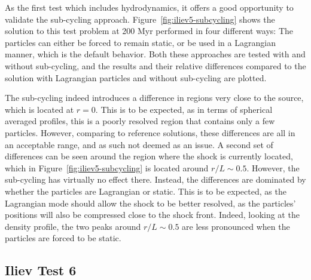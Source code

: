 As the first test which includes hydrodynamics, it offers a good opportunity to validate the
sub-cycling approach. Figure~\ref{fig:iliev5-subcycling} shows the solution to this test problem at
200 Myr performed in four different ways: The particles can either be forced to remain static, or
be used in a Lagrangian manner, which is the default behavior. Both these approaches are tested
with and without sub-cycling, and the results and their relative differences compared to the
solution with Lagrangian particles and without sub-cycling are plotted.

The sub-cycling indeed introduces a difference in regions very close to the source, which is
located at $r = 0$. This is to be expected, as in terms of spherical averaged profiles, this is a
poorly resolved region that contains only a few particles. However, comparing to reference
solutions, these differences are all in an acceptable range, and as such not deemed as an issue. A
second set of differences can be seen around the region where the shock is currently located, which
in Figure~\ref{fig:iliev5-subcycling} is located around $r/L \sim 0.5$. However, the sub-cycling
has virtually no effect there. Instead, the differences are dominated by whether the particles are
Lagrangian or static. This is to be expected, as the Lagrangian mode should allow the shock to be
better resolved, as the particles' positions will also be compressed close to the shock front.
Indeed, looking at the density profile, the two peaks around $r/L \sim 0.5$ are less pronounced
when the particles are forced to be static.








\subsection{Iliev Test 6}\label{chap:Iliev6}


